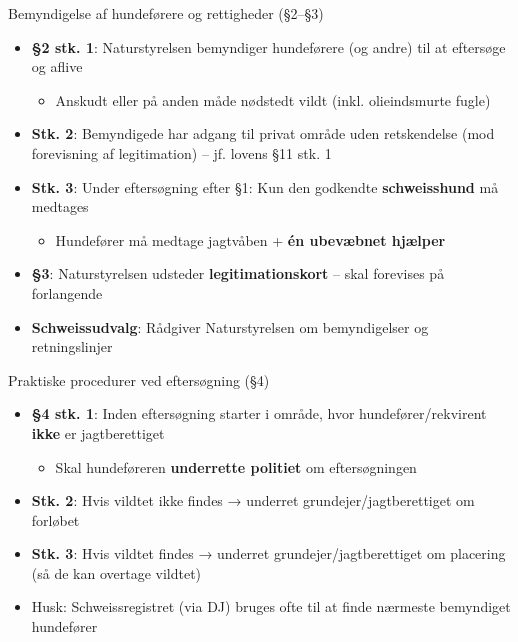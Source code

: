 \begin{frame}{Bemyndigelse af hundeførere og rettigheder (§2–§3)}
    \begin{itemize}
        \item \textbf{§2 stk. 1}: Naturstyrelsen bemyndiger hundeførere (og andre) til at eftersøge og aflive
          \begin{itemize}
            \item Anskudt eller på anden måde nødstedt vildt (inkl. olieindsmurte fugle)
          \end{itemize}
        \item \textbf{Stk. 2}: Bemyndigede har adgang til privat område uden retskendelse (mod forevisning af legitimation) – jf. lovens §11 stk. 1
        \item \textbf{Stk. 3}: Under eftersøgning efter §1: Kun den godkendte \textbf{schweisshund} må medtages
          \begin{itemize}
            \item Hundefører må medtage jagtvåben + \textbf{én ubevæbnet hjælper}
          \end{itemize}
        \item \textbf{§3}: Naturstyrelsen udsteder \textbf{legitimationskort} – skal forevises på forlangende
        \item \textbf{Schweissudvalg}: Rådgiver Naturstyrelsen om bemyndigelser og retningslinjer
    \end{itemize}
\end{frame}

\begin{frame}{Praktiske procedurer ved eftersøgning (§4)}
    \begin{itemize}
        \item \textbf{§4 stk. 1}: Inden eftersøgning starter i område, hvor hundefører/rekvirent \textbf{ikke} er jagtberettiget
          \begin{itemize}
            \item Skal hundeføreren \textbf{underrette politiet} om eftersøgningen
          \end{itemize}
        \item \textbf{Stk. 2}: Hvis vildtet ikke findes → underret grundejer/jagtberettiget om forløbet
        \item \textbf{Stk. 3}: Hvis vildtet findes → underret grundejer/jagtberettiget om placering (så de kan overtage vildtet)
        \item Husk: Schweissregistret (via DJ) bruges ofte til at finde nærmeste bemyndiget hundefører
    \end{itemize}
\end{frame}


